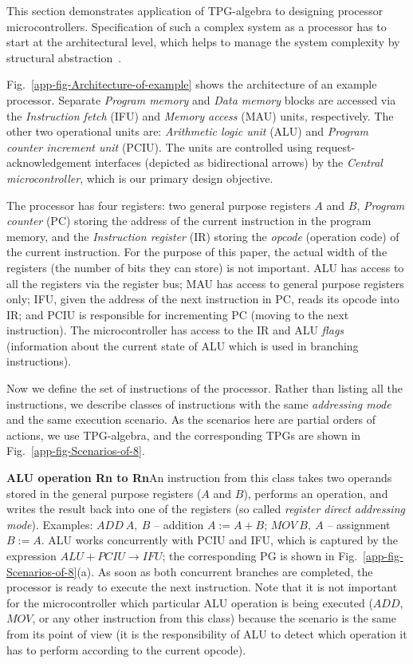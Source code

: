 This section demonstrates application of TPG-algebra to designing
processor microcontrollers. Specification of such a complex system
as a processor has to start at the architectural level, which helps
to manage the system complexity by structural abstraction~\cite{1994_de_micheli_book}.

Fig.~\ref{app-fig-Architecture-of-example} shows the architecture
of an example processor. Separate \emph{Program memory} and \emph{Data
memory} blocks are accessed via the \emph{Instruction fetch} (IFU)
and \emph{Memory access} (MAU) units, respectively. The other two
operational units are: \emph{Arithmetic logic unit} (ALU) and \emph{Program
counter increment unit} (PCIU). The units are controlled using request-acknowledgement
interfaces (depicted as bidirectional arrows) by the\textbf{\emph{
}}\emph{Central microcontroller}, which is our primary design objective. 

The processor has four registers: two general purpose registers $A$
and $B$, \emph{Program counter} (PC) storing the address of the current
instruction in the program memory, and the \emph{Instruction register}
(IR) storing the \emph{opcode} (operation code) of the current instruction.
For the purpose of this paper, the actual width of the registers (the
number of bits they can store) is not important. ALU has access to
all the registers via the register bus; MAU has access to general
purpose registers only; IFU, given the address of the next instruction
in PC, reads its opcode into IR; and PCIU is responsible for incrementing
PC (moving to the next instruction). The microcontroller has access
to the IR and ALU \emph{flags} (information about the current state
of ALU which is used in branching instructions).

Now we define the set of instructions of the processor. Rather than
listing all the instructions, we describe classes of instructions
with the same \emph{addressing mode}~\cite{mspmanual} and the same
execution scenario. As the scenarios here are partial orders of actions,
we use TPG-algebra, and the corresponding TPGs are shown in Fig.~\ref{app-fig-Scenarios-of-8}.

\textbf{ALU operation Rn to Rn}\quad{}An instruction from this class
takes two operands stored in the general purpose registers ($A$ and
$B$), performs an operation, and writes the result back into one
of the registers (so called \emph{register direct addressing mode}).
Examples: $\mathit{ADD\ A,\ B}$ -- addition $A:=A+B$; $\mathit{MOV\ B,\ A}$
-- assignment $B:=A$. ALU works concurrently with PCIU and IFU, which
is captured by the expression $\mathit{ALU}+\mathit{PCIU\rightarrow\mathit{IFU}}$;
the corresponding PG is shown in Fig.~\ref{app-fig-Scenarios-of-8}(a).
As soon as both concurrent branches are completed, the processor is
ready to execute the next instruction. Note that it is not important
for the microcontroller which particular ALU operation is being executed
($\mathit{ADD}$, $\mathit{MOV}$, or any other instruction from this
class) because the scenario is the same from its point of view (it
is the responsibility of ALU to detect which operation it has to perform
according to the current opcode). 

